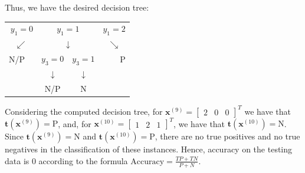 \documentclass{exam}
\begin{document}
\begin{questions}
\begin{table}[H]
\begin{tabular}{lll|ll|ll|lll}
            \end{tabular}
        \end{table}
        Thus, we have the desired decision tree:
        \vspace{-0.25em}
        \begin{table}[H]
            \centering
            \begin{tabular}{llccrr}
            \multicolumn{2}{r}{$y_1 = 0$}  & \multicolumn{2}{c}{$y_1 = 1$}    & \multicolumn{2}{l}{$y_1 = 2$}  \\
            \multicolumn{2}{c}{$\swarrow$} & \multicolumn{2}{c}{$\downarrow$} & \multicolumn{2}{c}{$\searrow$} \\
            N/P         &                  & $y_3 = 0$       & $y_3 = 1$      &                     & P        \\
                        &        & $\downarrow$    & $\downarrow$   &        &          \\
                        &                  & N/P             & N              &                     &         
            \end{tabular}
        \end{table}
        \item Considering the computed decision tree, for $\textbf{x}^{(9)} = 
        \begin{bmatrix}
            2 & 0 & 0
        \end{bmatrix}^T$ 
        we have that $\textbf{\^{t}}(\textbf{x}^{(9)}) = \text{P}$, and, for $\textbf{x}^{(10)} = 
        \begin{bmatrix}
            1 & 2 & 1
        \end{bmatrix}^T$, we have that $\textbf{\^{t}}(\textbf{x}^{(10)}) = \text{N}$. Since $\textbf{t}(\textbf{x}^{(9)}) = \text{N}$ and $\textbf{t}(\textbf{x}^{(10)}) = \text{P}$, there are no true positives and no true negatives in the classification of these instances. Hence, accuracy on the testing data is 0 according to the formula $\text{Accuracy} = \frac{TP + TN}{P + N}$.

    \end{questions}
\end{document}
